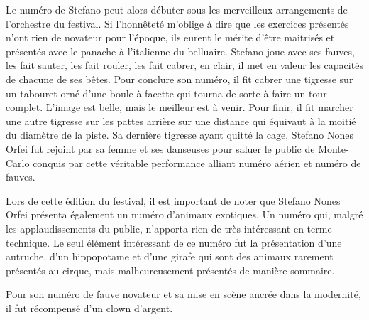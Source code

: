 Le numéro de Stefano peut alors débuter sous les merveilleux arrangements de l’orchestre du festival. Si l’honnêteté m’oblige à dire que les exercices présentés n’ont rien de novateur pour l’époque, ils eurent le mérite d’être maitrisés et présentés avec le panache à l’italienne du belluaire. Stefano joue avec ses fauves, les fait sauter, les fait rouler, les fait cabrer, en clair, il met en valeur les capacités de chacune de ses bêtes. Pour conclure son numéro, il fit cabrer une tigresse sur un tabouret orné d'une boule à facette qui tourna de sorte à faire un tour complet. L’image est belle, mais le meilleur est à venir. Pour finir, il fit marcher une autre tigresse sur les pattes arrière sur une distance qui équivaut à la moitié du diamètre de la piste. Sa dernière tigresse ayant quitté la cage, Stefano Nones Orfei fut rejoint par sa femme et ses danseuses pour saluer le public de Monte-Carlo conquis par cette véritable performance alliant numéro aérien et numéro de fauves.

Lors de cette édition du festival, il est important de noter que Stefano Nones Orfei présenta également un numéro d’animaux exotiques. Un numéro qui, malgré les applaudissements du public, n’apporta rien de très intéressant en terme technique. Le seul élément intéressant de ce numéro fut la présentation d’une autruche, d’un hippopotame et d’une girafe qui sont des animaux rarement présentés au cirque, mais malheureusement présentés de manière sommaire.

Pour son numéro de fauve novateur et sa mise en scène ancrée dans la modernité, il fut récompensé d’un clown d’argent.














